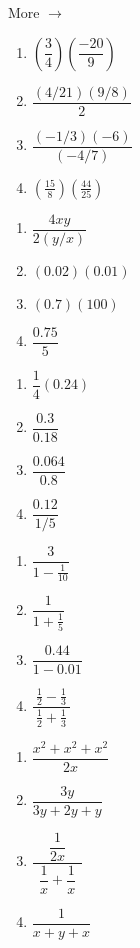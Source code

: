 \documentclass[11pt]{article}
\newcommand{\ds}{\displaystyle}
\begin{document}
\hfill More $\longrightarrow$

\newpage
\begin{multicols}{4}
\begin{enumerate}
\setcounter{enumi}{\theenumCount}
\item $\left(\dfrac{3}{4} \right) \left( \dfrac{-20}{9} \right)$
\item $\dfrac{(4/21)(9/8)}{2}$
\item $\dfrac{(-1/3)(-6)}{(-4/7)}$
\item $\ds \left(\frac{15}{8} \right) \left( \frac{44}{25} \right)$
\setcounter{enumCount}{\theenumi}
\end{enumerate}
\end{multicols}
\vfill

\begin{multicols}{4}
\begin{enumerate}
\setcounter{enumi}{\theenumCount}
\item $\dfrac{4xy}{2(y/x)}$
\item $(0.02)(0.01)$
\item $(0.7)(100)$
\item $\dfrac{0.75}{ 5 }$
\setcounter{enumCount}{\theenumi}
\end{enumerate}
\end{multicols}
\vfill

\begin{multicols}{4}
\begin{enumerate}
\setcounter{enumi}{\theenumCount}
\item $\dfrac{1}{4}(0.24)$
\item $\dfrac{0.3}{0.18}$
\item $\dfrac{0.064}{0.8}$
\item $\dfrac{0.12}{ 1/5 }$
\setcounter{enumCount}{\theenumi}
\end{enumerate}
\end{multicols}
\vfill

\begin{multicols}{4}
\begin{enumerate}
\setcounter{enumi}{\theenumCount}
\item $\dfrac{3}{1-\tfrac{1}{10}}$
\item $\dfrac{1}{1+\tfrac{1}{5}}$
\item $\dfrac{0.44}{1-0.01}$
\item $\dfrac{~\frac{1}{2}-\frac{1}{3}~}{\frac{1}{2} + \frac{1}{3}}$
\setcounter{enumCount}{\theenumi}
\end{enumerate}
\end{multicols}
\vfill

\begin{multicols}{4}
\begin{enumerate}
\setcounter{enumi}{\theenumCount}
\item $\dfrac{x^2+x^2+x^2}{2x}$
\item $\dfrac{3y}{3y+2y+y}$
\item $\dfrac{~~\dfrac{1}{2x}~~}{~~\dfrac{1}{x}+\dfrac{1}{x}~~}$
\item $\dfrac{1}{x+y+x}$
\setcounter{enumCount}{\theenumi}
\end{enumerate}
\end{multicols}
\vfill
\end{document}
